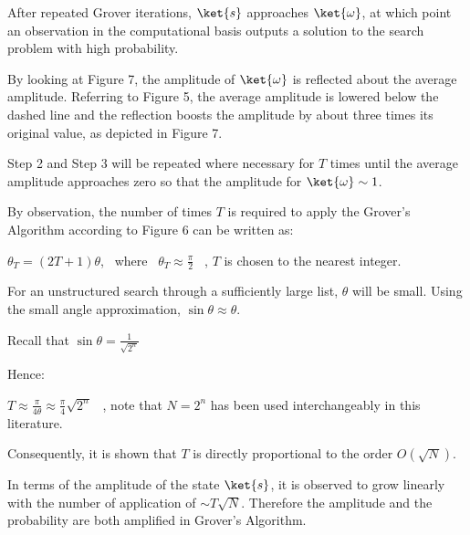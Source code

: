 \documentclass{article}
\begin{document}
\noindent
After repeated Grover iterations, $\ket{s}$ approaches $\ket{\omega}$, at which point an observation in the computational basis
outputs a solution to the search problem with high probability.
\vspace{5mm}

\noindent
By looking at Figure 7, the amplitude of $\ket{\omega}$ is reflected about the average amplitude. Referring to Figure 5, the average amplitude is lowered below the dashed line and the reflection boosts the amplitude by about three times its original value, as depicted in Figure 7.
\vspace{5mm}

\noindent
Step 2 and Step 3 will be repeated where necessary for $T$ times until the average amplitude approaches zero so that the amplitude for $\ket{\omega} \sim 1$\cite{de_wolf_main_nodate}.
\vspace{5mm}

\noindent
By observation, the number of times $T$ is required to apply the Grover's Algorithm according to Figure 6 can be written as:
\vspace{5mm}

\noindent
\qquad $\theta_T = (2T + 1)\theta$, \ where \ $\theta_T \approx \frac{\pi}{2}$ \ , $T$ is chosen to the nearest integer. 
\vspace{5mm}

\noindent
For an unstructured search through a sufficiently large list, $\theta$ will be small. Using the small angle approximation, $\sin\theta \approx \theta$. 
\vspace{5mm}

\noindent
Recall that $\sin\theta = \frac{1}{\sqrt{2^n}}$
\vspace{5mm}

\noindent
Hence:
\vspace{5mm}

\noindent
\qquad $T \approx \frac{\pi}{4\theta} \approx \frac{\pi}{4}\sqrt{2^n}$ \ , note that $N = 2^n$ has been used interchangeably in this literature.
\vspace{5mm}

\noindent
Consequently, it is shown that $T$ is directly proportional to the order $O(\sqrt{N})$.
\pagebreak

\noindent
In terms of the amplitude of the state $\ket{s}$, it is observed to grow linearly with the number of application of $\sim T\sqrt{N}$. Therefore the amplitude and the probability are both amplified in Grover's Algorithm.
\vspace{5mm}
\end{document}
